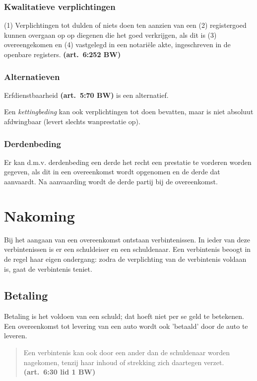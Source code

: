 \documentclass[a4paper]{article}
\newcommand{\art}[1]{\textbf{(art.~#1 BW)}\xspace}
\begin{document}
\subsubsection{Kwalitatieve verplichtingen}

(1) Verplichtingen tot dulden of niets doen ten aanzien van een (2)
registergoed kunnen overgaan op op diegenen die het goed verkrijgen, als dit
is (3) overeengekomen en (4) vastgelegd in een notariële akte, ingeschreven in
de openbare registers. \art{6:252}

\subsubsection{Alternatieven}

Erfdienstbaarheid \art{5:70} is een alternatief.

Een \emph{kettingbeding} kan ook verplichtingen tot doen bevatten, maar is
niet absoluut afdwingbaar (levert slechts wanprestatie op).

\subsubsection{Derdenbeding}

Er kan d.m.v. derdenbeding een derde het recht een prestatie te vorderen
worden gegeven, als dit in een overeenkomst wordt opgenomen en de derde dat
aanvaardt. Na aanvaarding wordt de derde partij bij de overeenkomst.



\section{Nakoming}

Bij het aangaan van een overeenkomst ontstaan verbintenissen. In ieder van
deze verbintenissen is er een schuldeiser en een schuldenaar. Een verbintenis
beoogt in de regel haar eigen ondergang: zodra de verplichting van de
verbintenis voldaan is, gaat de verbintenis teniet.

\subsection{Betaling}

Betaling is het voldoen van een schuld; dat hoeft niet per se geld te
betekenen. Een overeenkomst tot levering van een auto wordt ook 'betaald' door
de auto te leveren.

\begin{quote}

  Een verbintenis kan ook door een ander dan de schuldenaar worden nagekomen,
  tenzij haar inhoud of strekking zich daartegen verzet. \art{6:30 lid 1}

\end{quote}
\end{document}
